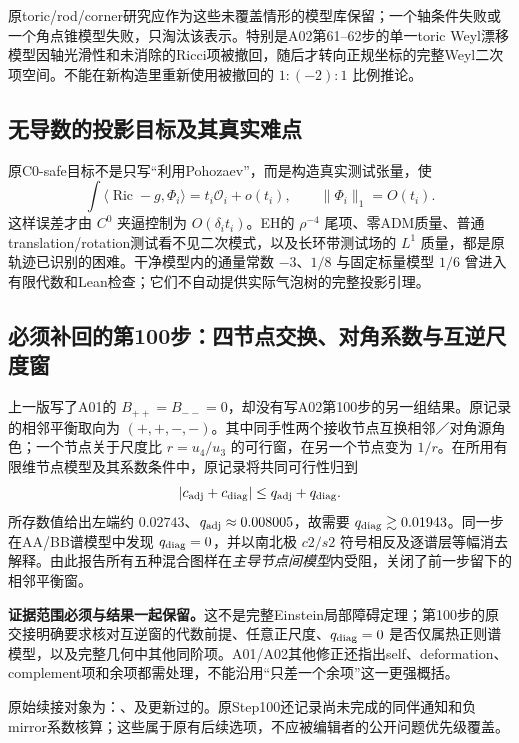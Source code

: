 \documentclass[UTF8,a4paper,11pt,fontset=fandol]{ctexart}
\numberwithin{equation}{section}
\theoremstyle{definition}
\newcommand{\Ric}{\operatorname{Ric}}
\begin{document}
原toric/rod/corner研究应作为这些未覆盖情形的模型库保留；一个轴条件失败或一个角点锥模型失败，只淘汰该表示。特别是A02第61--62步的单一toric Weyl漂移模型因轴光滑性和未消除的Ricci项被撤回，随后才转向正规坐标的完整Weyl二次项空间。不能在新构造里重新使用被撤回的 $1:(-2):1$ 比例推论。

\subsection{无导数的投影目标及其真实难点}
原C0-safe目标不是只写“利用Pohozaev”，而是构造真实测试张量，使
\[
\int\langle\Ric-g,\Phi_i\rangle=t_i\mathcal O_i+o(t_i),
\qquad \|\Phi_i\|_1=O(t_i).
\]
这样误差才由 $C^0$ 夹逼控制为 $O(\delta_i t_i)$。EH的 $\rho^{-4}$ 尾项、零ADM质量、普通translation/rotation测试看不见二次模式，以及长环带测试场的 $L^1$ 质量，都是原轨迹已识别的困难。干净模型内的通量常数 $-3$、$1/8$ 与固定标量模型 $1/6$ 曾进入有限代数和Lean检查；它们不自动提供实际气泡树的完整投影引理。

\subsection{必须补回的第100步：四节点交换、对角系数与互逆尺度窗}
上一版写了A01的 $B_{++}=B_{--}=0$，却没有写A02第100步的另一组结果。原记录的相邻平衡取向为 $(+,+,-,-)$。其中同手性两个接收节点互换相邻／对角源角色；一个节点关于尺度比 $r=u_4/u_3$ 的可行窗，在另一个节点变为 $1/r$。在所用有限维节点模型及其系数条件中，原记录将共同可行性归到
\[
|c_{\rm adj}+c_{\rm diag}|\le q_{\rm adj}+q_{\rm diag}.
\]
所存数值给出左端约 $0.02743$、$q_{\rm adj}\approx0.008005$，故需要 $q_{\rm diag}\gtrsim0.01943$。同一步在AA/BB谱模型中发现 $q_{\rm diag}=0$，并以南北极 $c2/s2$ 符号相反及逐谱层等幅消去解释。由此报告所有五种混合图样在\emph{主导节点间模型}内受阻，关闭了前一步留下的相邻平衡窗。

\textbf{证据范围必须与结果一起保留。}这不是完整Einstein局部障碍定理；第100步的原交接明确要求核对互逆窗的代数前提、任意正尺度、$q_{\rm diag}=0$ 是否仅属热正则谱模型，以及完整几何中其他同阶项。A01/A02其他修正还指出self、deformation、complement项和余项都需处理，不能沿用“只差一个余项”这一更强概括。

原始续接对象为：、及更新过的。原Step100还记录尚未完成的同伴通知和负mirror系数核算；这些属于原有后续选项，不应被编辑者的公开问题优先级覆盖。
\end{document}

